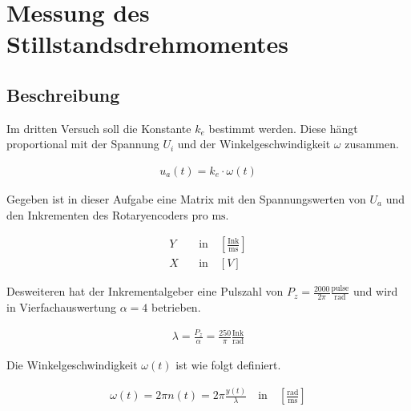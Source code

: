 \section{Messung des Stillstandsdrehmomentes}

\subsection{Beschreibung}

Im dritten Versuch soll die Konstante $k_e$ bestimmt werden. Diese
hängt proportional mit der Spannung $U_i$ und der Winkelgeschwindigkeit
$\omega$ zusammen.

\begin{equation} \label{eq131}
    \begin{split}
        u_a(t)=k_e \cdot \omega (t)
    \end{split}
\end{equation}

Gegeben ist in dieser Aufgabe eine Matrix mit den Spannungswerten von
$U_a$ und den Inkrementen des Rotaryencoders pro $\mathrm{ms}$.

\begin{equation} \label{eq132}
    \begin{split}
        Y& \quad \text{in} \quad \left[\frac{\mathrm{Ink}}{\mathrm{ms}}\right]\\
        X& \quad \text{in} \quad [V]
    \end{split}
\end{equation}

Desweiteren hat der Inkrementalgeber eine Pulszahl von $P_z=\frac{2000}{2\pi} \mathrm{\frac{pulse}{rad}}$
und wird in Vierfachauswertung $\alpha=4$ betrieben.

\begin{equation} \label{eq133}
    \begin{split}
        \lambda = \frac{P_z}{\alpha} = \frac{250}{\pi} \mathrm{\frac{Ink}{rad}}
    \end{split}
\end{equation}

Die Winkelgeschwindigkeit $\omega(t)$ ist wie folgt definiert.

\begin{equation} \label{eq134}
    \begin{split}
       \omega(t)= 2 \pi n(t)=2 \pi \frac{y(t)}{\lambda} \quad \text{in} \quad \left[\mathrm{\frac{rad}{ms}} \right]
    \end{split}
\end{equation}

